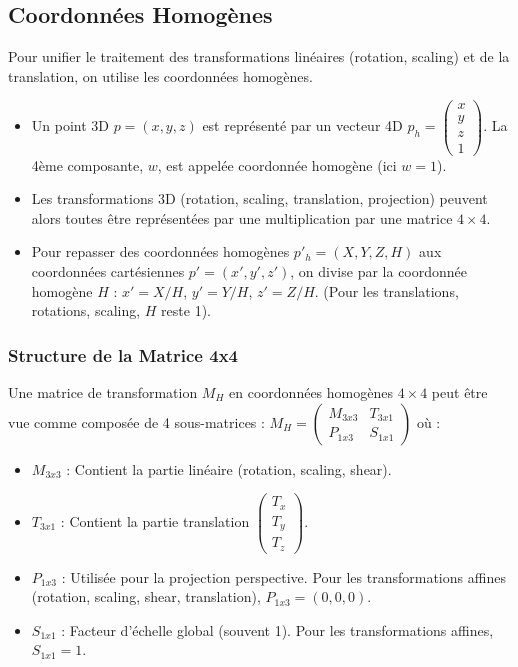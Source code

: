 \documentclass{article}
\begin{document}
\subsection{Coordonnées Homogènes}

Pour unifier le traitement des transformations linéaires (rotation, scaling) et de la translation, on utilise les coordonnées homogènes.
\begin{itemize}
    \item Un point 3D $p=(x, y, z)$ est représenté par un vecteur 4D $p_h = \begin{pmatrix} x \\ y \\ z \\ 1 \end{pmatrix}$. La 4ème composante, $w$, est appelée coordonnée homogène (ici $w=1$).
    \item Les transformations 3D (rotation, scaling, translation, projection) peuvent alors toutes être représentées par une multiplication par une matrice $4 \times 4$.
    \item Pour repasser des coordonnées homogènes $p'_h = (X, Y, Z, H)$ aux coordonnées cartésiennes $p'=(x', y', z')$, on divise par la coordonnée homogène $H$ :
    $x' = X/H$, $y' = Y/H$, $z' = Z/H$. (Pour les translations, rotations, scaling, $H$ reste 1).
\end{itemize}

\subsubsection{Structure de la Matrice 4x4}
Une matrice de transformation $M_H$ en coordonnées homogènes $4 \times 4$ peut être vue comme composée de 4 sous-matrices :
$M_H = \begin{pmatrix} M_{3x3} & T_{3x1} \\ P_{1x3} & S_{1x1} \end{pmatrix}$
où :
\begin{itemize}
    \item $M_{3x3}$ : Contient la partie linéaire (rotation, scaling, shear).
    \item $T_{3x1}$ : Contient la partie translation $\begin{pmatrix} T_x \\ T_y \\ T_z \end{pmatrix}$.
    \item $P_{1x3}$ : Utilisée pour la projection perspective. Pour les transformations affines (rotation, scaling, shear, translation), $P_{1x3} = (0, 0, 0)$.
    \item $S_{1x1}$ : Facteur d'échelle global (souvent 1). Pour les transformations affines, $S_{1x1}=1$.
\end{itemize}
\end{document}
